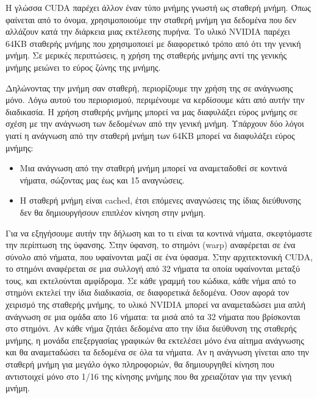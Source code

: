 Η γλώσσα CUDA παρέχει άλλον έναν τύπο μνήμης γνωστή ως σταθερή μνήμη. Όπως φαίνεται από το όνομα, χρησιμοποιούμε την σταθερή μνήμη για δεδομένα που δεν αλλάζουν κατά την διάρκεια μιας εκτέλεσης πυρήνα. Το υλικό NVIDIA παρέχει 64KB σταθερής μνήμης που χρησιμοποιεί με διαφορετικό τρόπο από ότι την γενική μνήμη. Σε μερικές περιπτώσεις, η χρήση της σταθερής μνήμης αντί της γενικής μνήμης μειώνει το εύρος ζώνης της μνήμης. 

Δηλώνοντας την μνήμη σαν σταθερή, περιορίζουμε την χρήση της σε ανάγνωσης μόνο. Λόγω αυτού του περιορισμού, περιμένουμε να κερδίσουμε κάτι από αυτήν την διαδικασία. Η χρήση σταθερής μνήμης μπορεί να μας διαφυλάξει εύρος μνήμης σε σχέση με την ανάγνωση των δεδομένων από την γενική μνήμη. Υπάρχουν δύο λόγοι γιατί η ανάγνωση από την σταθερή μνήμη των 64KB μπορεί να διαφυλάξει εύρος μνήμης:
\begin{itemize}
\item Μια ανάγνωση από την σταθερή μνήμη μπορεί να αναμεταδοθεί σε κοντινά νήματα, σώζοντας μας έως και 15 αναγνώσεις.
\item Η σταθερή μνήμη είναι cached, έτσι επόμενες αναγνώσεις της ίδιας διεύθυνσης δεν θα δημιουργήσουν επιπλέον κίνηση στην μνήμη.
\end{itemize}
Για να εξηγήσουμε αυτήν την δήλωση και το τι είναι τα κοντινά νήματα, σκεφτόμαστε την περίπτωση της ύφανσης. Στην ύφανση, το στημόνι (warp) αναφέρεται σε ένα σύνολο από νήματα, που υφαίνονται μαζί σε ένα ύφασμα. Στην αρχιτεκτονική CUDA, το στημόνι αναφέρεται σε μια συλλογή από 32 νήματα τα οποία υφαίνονται μεταξύ τους, και εκτελούνται αμφίδρομα. Σε κάθε γραμμή του κώδικα, κάθε νήμα από το στημόνι εκτελεί την ίδια διαδικασία, σε διαφορετικά δεδομένα.
Όσον αφορά τον χειρισμό της σταθερής μνήμης, το υλικό NVIDIA μπορεί να αναμεταδώσει μια απλή ανάγνωση σε μια ομάδα απο 16 νήματα: τα μισά από τα 32 νήματα που βρίσκονται στο στημόνι. Αν κάθε νήμα ζητάει δεδομένα απο την ίδια διεύθυνση της σταθερής μνήμης, η μονάδα επεξεργασίας γραφικών θα εκτελέσει μόνο ένα αίτημα ανάγνωσης και θα αναμεταδώσει τα δεδομένα σε όλα τα νήματα. Αν η ανάγνωση γίνεται απο την σταθερή μνήμη για μεγάλο όγκο πληροφοριών, θα δημιουργηθεί κίνηση που αντιστοιχεί μόνο στο 1/16 της κίνησης μνήμης που θα χρειαζόταν για την γενική μνήμη.

